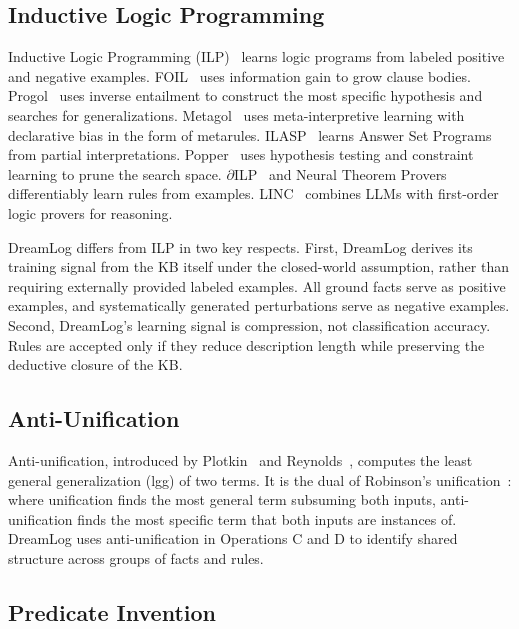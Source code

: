 \documentclass[10pt,conference]{IEEEtran}
\begin{document}
\subsection{Inductive Logic Programming}

Inductive Logic Programming (ILP)~\cite{muggleton1994inductive} learns logic programs from labeled positive and negative examples. FOIL~\cite{quinlan1990learning} uses information gain to grow clause bodies. Progol~\cite{muggleton1995inverse} uses inverse entailment to construct the most specific hypothesis and searches for generalizations. Metagol~\cite{muggleton2014meta} uses meta-interpretive learning with declarative bias in the form of metarules. ILASP~\cite{law2014ilasp} learns Answer Set Programs from partial interpretations. Popper~\cite{cropper2021learning} uses hypothesis testing and constraint learning to prune the search space. $\partial$ILP~\cite{evans2018learning} and Neural Theorem Provers~\cite{rocktaschel2017end} differentiably learn rules from examples. LINC~\cite{olausson2023linc} combines LLMs with first-order logic provers for reasoning.

DreamLog differs from ILP in two key respects. First, DreamLog derives its training signal from the KB itself under the closed-world assumption, rather than requiring externally provided labeled examples. All ground facts serve as positive examples, and systematically generated perturbations serve as negative examples. Second, DreamLog's learning signal is compression, not classification accuracy. Rules are accepted only if they reduce description length while preserving the deductive closure of the KB.

\subsection{Anti-Unification}

Anti-unification, introduced by Plotkin~\cite{plotkin1970note} and Reynolds~\cite{reynolds1970transformational}, computes the least general generalization (lgg) of two terms. It is the dual of Robinson's unification~\cite{robinson1965machine}: where unification finds the most general term subsuming both inputs, anti-unification finds the most specific term that both inputs are instances of. DreamLog uses anti-unification in Operations C and D to identify shared structure across groups of facts and rules.

\subsection{Predicate Invention}
\end{document}
